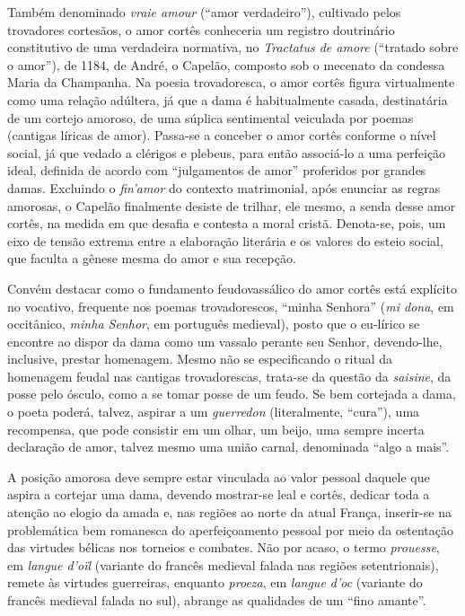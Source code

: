 Também denominado \textit{vraie amour} (“amor verdadeiro”), cultivado
pelos trovadores cortesãos, o amor cortês conheceria um registro
doutrinário constitutivo de uma verdadeira normativa, no
\textit{Tractatus de amore} (“tratado sobre o amor”), de 1184, de
André, o Capelão, composto sob o mecenato da condessa Maria da
Champanha. Na poesia trovadoresca, o amor cortês figura virtualmente
como uma relação adúltera, já que a dama é habitualmente casada,
destinatária de um cortejo amoroso, de uma súplica sentimental
veiculada por poemas (cantigas líricas de amor). Passa-se a conceber o
amor cortês conforme o nível social, já que vedado a clérigos e
plebeus, para então associá-lo a uma perfeição ideal, definida de
acordo com “julgamentos de amor” proferidos por grandes damas.
Excluindo o \textit{fin’amor} do contexto matrimonial, após enunciar as
regras amorosas, o Capelão finalmente desiste de trilhar, ele mesmo, a
senda desse amor cortês, na medida em que desafia e contesta a moral
cristã. Denota-se, pois, um eixo de tensão extrema entre a elaboração
literária e os valores do esteio social, que faculta a gênese mesma do
amor e sua recepção. 

Convém destacar como o fundamento feudovassálico do amor cortês está
explícito no vocativo, frequente nos poemas trovadorescos, “minha
Senhora” (\textit{mi dona}, em occitânico, \textit{minha Senhor}, em
português medieval), posto que o eu-lírico se encontre ao dispor da
dama como um vassalo perante seu Senhor, devendo-lhe, inclusive,
prestar homenagem. Mesmo não se especificando o ritual da homenagem
feudal nas cantigas trovadorescas, trata-se da questão da
\textit{saisine}, da posse pelo ósculo, como a se tomar posse de um
feudo. Se bem cortejada a dama, o poeta poderá, talvez, aspirar a um
\textit{guerredon} (literalmente, “cura”), uma recompensa, que pode
consistir em um olhar, um beijo, uma sempre incerta declaração de amor,
talvez mesmo uma união carnal, denominada “algo a mais”.

A posição amorosa deve sempre estar vinculada ao valor pessoal daquele
que aspira a cortejar uma dama, devendo mostrar-se leal e cortês,
dedicar toda a atenção ao elogio da amada e, nas regiões ao norte da
atual França, inserir-se na problemática bem romanesca do
aperfeiçoamento pessoal por meio da ostentação das virtudes bélicas nos
torneios e combates. Não por acaso, o termo \textit{prouesse}, em
\textit{langue d’oïl} (variante do francês medieval falada nas regiões
setentrionais), remete às virtudes guerreiras, enquanto
\textit{proeza}, em \textit{langue d’oc} (variante do francês medieval
falada no sul), abrange as qualidades de um “fino amante”.  

